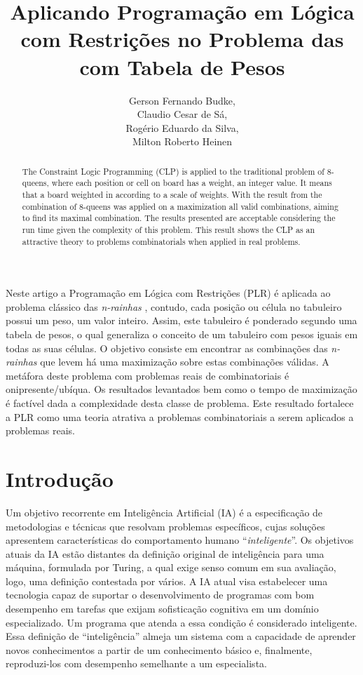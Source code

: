 \documentclass[12pt]{article}
\title{Aplicando Programação em Lógica com Restrições no Problema das \Nrainhas com Tabela de Pesos}
\author{Gerson Fernando Budke\inst{1}, \\     
Claudio Cesar de Sá\inst{1},\\
Rogério Eduardo da Silva\inst{1},\\
Milton Roberto Heinen\inst{1}
}
\newcommand{\nrainhas}{\emph{n-rainhas }}
\theoremstyle{definition}
\begin{document}
\maketitle

\begin{resumo}
Neste artigo a Programação em Lógica com Restrições (PLR) é aplicada ao problema clássico das \nrainhas, contudo, cada posição ou célula no tabuleiro possui um peso, um valor inteiro. Assim, este tabuleiro é ponderado segundo uma tabela de pesos, o qual generaliza o conceito de um tabuleiro com pesos iguais em todas as suas células. O objetivo consiste em encontrar as combinações das \nrainhas que levem há  uma maximização
sobre estas combinações válidas. A metáfora deste problema com problemas reais de combinatoriais é onipresente/ubíqua.
Os resultados levantados bem como o tempo de maximização é factível dada a complexidade desta classe de problema.
 Este resultado fortalece a PLR como uma teoria atrativa a problemas combinatoriais
a serem aplicados a problemas reais.
\end{resumo}

\begin{abstract}
The Constraint Logic Programming (CLP) is applied to the traditional problem of
8-queens, where each position or cell on board has a weight, an integer value. It means that a board weighted in according to a scale of weights. With the result from the combination of 8-queens was applied on a maximization all valid combinations, aiming to find its maximal combination. The results presented are acceptable considering the run time given the complexity of this problem. This result shows the CLP as an attractive theory to problems combinatorials when applied in real problems.

\end{abstract}


\section{Introdução}
\label{sec_introducao}

Um objetivo recorrente em Inteligência Artificial (IA) é a especificação
de metodologias e técnicas que resolvam problemas específicos, cujas
soluções apresentem características do comportamento humano
``{\em inteligente}''.  Os objetivos atuais da IA estão distantes da definição original de inteligência para uma máquina, 
formulada por Turing, a qual exige senso comum em sua avaliação, logo, uma definição  contestada por vários. 
A IA
atual visa estabelecer uma tecnologia capaz de suportar o desenvolvimento
de programas com bom desempenho em tarefas que exijam sofisticação
cognitiva em um domínio especializado. Um programa que atenda a essa
condição é considerado inteligente. Essa  definição de
``inteligência'' \/ almeja um sistema com a capacidade de aprender novos conhecimentos a partir de 
um conhecimento básico e, finalmente, reproduzi-los com desempenho semelhante a um especialista.
\end{document}
